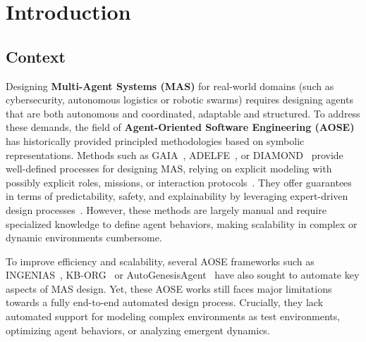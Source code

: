 \documentclass[pdflatex,sn-mathphys-num]{sn-jnl}%
\theoremstyle{thmstyleone}%
\theoremstyle{thmstyletwo}%
\theoremstyle{thmstylethree}%
\begin{document}




\maketitle

\section{Introduction}

\subsection{Context}

Designing \textbf{Multi-Agent Systems (MAS)} for real-world domains (such as cybersecurity, autonomous logistics or robotic swarms) requires designing agents that are both autonomous and coordinated, adaptable and structured. To address these demands, the field of \textbf{Agent-Oriented Software Engineering (AOSE)} has historically provided principled methodologies based on symbolic representations. Methods such as GAIA~\cite{gaia1998}, ADELFE~\cite{adelfe2002}, or DIAMOND~\cite{Jamont2007} provide well-defined processes for designing MAS, relying on explicit modeling with possibly explicit roles, missions, or interaction protocols~\cite{Pavon2003,Bernon1999}. They offer guarantees in terms of predictability, safety, and explainability by leveraging expert-driven design processes~\cite{Hindriks2014,Jamont2O15}. However, these methods are largely manual and require specialized knowledge to define agent behaviors, making scalability in complex or dynamic environments cumbersome.

To improve efficiency and scalability, several AOSE frameworks such as INGENIAS~\cite{Pavon2003}, KB-ORG~\cite{Sims2008} or AutoGenesisAgent~\cite{harper2024autogenesisagent} have also sought to automate key aspects of MAS design.
Yet, these AOSE works still faces major limitations towards a fully end-to-end automated design process. Crucially, they lack automated support for modeling complex environments as test environments, optimizing agent behaviors, or analyzing emergent dynamics.
\end{document}
